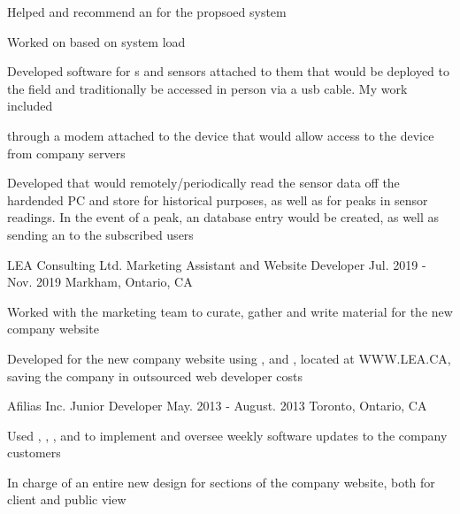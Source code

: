 \begin{cventries}
{\begin{cvitems}
        \begin{cvsubitems}
          \item {Helped  and recommend an  for the propsoed system}
          \item {Worked on  based on system load}
        \end{cvsubitems}
      \item {Developed software for s and sensors attached to them that would be deployed to the field and traditionally be accessed in person via a usb cable. My work included}
        \begin{cvsubitems}
          \item { through a modem attached to the device that would allow  access to the device from company servers}
          \item {Developed  that would remotely/periodically read the sensor data off the hardended PC and store for historical purposes,
           as well as  for peaks in sensor readings. In the event of a peak, an  database entry would be created, as well as sending an  to the subscribed users}
        \end{cvsubitems}
    \end{cvitems}
  }
\cventry
{LEA Consulting Ltd.} %
{Marketing Assistant and Website Developer} %
{Jul. 2019 - Nov. 2019} %
{Markham, Ontario, CA} %
{
  \begin{cvitems} %
    \item {Worked with the marketing team to curate, gather and write material for the new company website}
    \item {Developed  for the new company website using ,  and , located at WWW.LEA.CA, saving the company  in outsourced web developer costs}
  \end{cvitems}
}

\cventry
{Afilias Inc.} %
{Junior Developer} %
{May. 2013 - August. 2013} %
{Toronto, Ontario, CA} %
{
  \begin{cvitems} %
    \item {Used , , ,  and  to implement and oversee weekly software updates to the company customers}
    \item {In charge of an entire new design for sections of the company website, both for client and public view}
  \end{cvitems}
}

\end{cventries}
